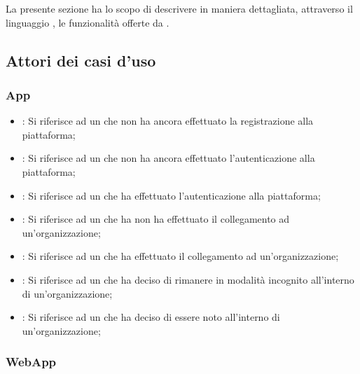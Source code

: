 \documentclass[../analisi-dei-requisiti]{subfiles}
\begin{document}
La presente sezione ha lo scopo di descrivere in maniera dettagliata, attraverso il linguaggio , le funzionalità offerte da .

\subsection{Attori dei casi d'uso}%
\label{sub:attori_casi_duso}

\subsubsection{App}%
\label{subsub:utenti}

\begin{itemize}
  \item \textbf{}: Si riferisce ad un  che non ha ancora effettuato la registrazione alla piattaforma;
  \item \textbf{}: Si riferisce ad un  che non ha ancora effettuato l'autenticazione alla piattaforma;
  \item \textbf{}: Si riferisce ad un  che ha effettuato l'autenticazione alla piattaforma;
  \item \textbf{}: Si riferisce ad un  che ha non ha effettuato il collegamento ad un'organizzazione;
  \item \textbf{}: Si riferisce ad un  che ha effettuato il collegamento ad un'organizzazione;
  \item \textbf{}: Si riferisce ad un  che ha deciso di rimanere in modalità incognito all'interno di un'organizzazione;
  \item \textbf{}: Si riferisce ad un  che ha deciso di essere noto all'interno di un'organizzazione;
\end{itemize}

\subsubsection{WebApp}%
\label{subsub:super_utenti}
\end{document}
